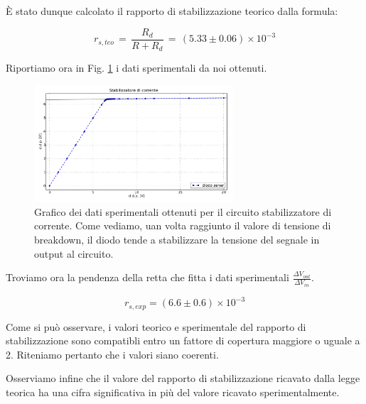 È stato dunque calcolato il rapporto di stabilizzazione teorico dalla formula: 

\begin{equation}
r_{s,teo}\,=\,\frac{R_d}{R+R_d}\,=\, (5.33 \pm 0.06) \times 10^{-3}
\label{RS_teo}
\end{equation}

Riportiamo ora in Fig. \ref{fig:stabilizer} i dati sperimentali da noi ottenuti.

\begin{figure}[h]
\center
	\includegraphics[width=0.66\textwidth]{stabilizer.pdf}
	\caption{Grafico dei dati sperimentali ottenuti per il circuito stabilizzatore di corrente. Come vediamo, uan volta raggiunto il valore di tensione di breakdown, il diodo tende a stabilizzare la tensione del segnale in output al circuito.}
	\label{fig:stabilizer}
\end{figure}

Troviamo ora la pendenza della retta che fitta i dati sperimentali $\frac{\Delta V_{out}}{\Delta V_{in}}$.

$$r_{s,exp}= (6.6 \pm 0.6) \times 10^{-3} $$

Come si può osservare, i valori teorico e sperimentale del rapporto di stabilizzazione sono compatibli entro un fattore di copertura maggiore o uguale a 2. Riteniamo pertanto che i valori siano coerenti.

Osserviamo infine che il valore del rapporto di stabilizzazione ricavato dalla legge teorica ha una cifra significativa in più del valore ricavato sperimentalmente.
